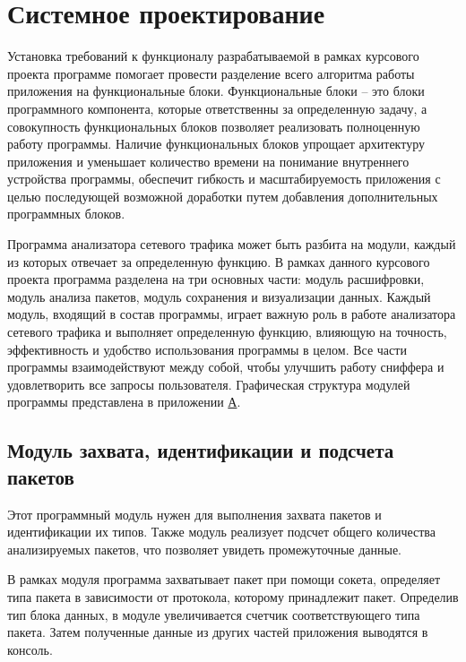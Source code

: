 \section{Системное проектирование}
\label{sec:sysproj}

Установка требований к функционалу разрабатываемой в рамках
курсового проекта программе помогает провести разделение всего алгоритма
работы приложения на функциональные блоки. Функциональные блоки -- это
блоки программного компонента, которые ответственны за определенную
задачу, а совокупность функциональных блоков позволяет реализовать
полноценную работу программы. Наличие функциональных блоков упрощает 
архитектуру приложения и уменьшает количество времени на понимание 
внутреннего устройства программы, обеспечит гибкость и масштабируемость 
приложения с целью последующей возможной доработки путем добавления 
дополнительных программных блоков.


Программа анализатора сетевого трафика может быть разбита на модули,
каждый из которых отвечает за определенную функцию. В рамках данного
курсового проекта программа разделена на три основных части: модуль
расшифровки, модуль анализа пакетов, модуль сохранения и визуализации
данных. Каждый модуль, входящий в состав программы, играет важную роль в
работе анализатора сетевого трафика и выполняет определенную функцию,
влияющую на точность, эффективность и удобство использования
программы в целом. Все части программы взаимодействуют между собой, чтобы
улучшить работу сниффера и удовлетворить все запросы пользователя.
Графическая структура модулей программы представлена в приложении \hyperref[sec:appendix:scheme_struct]{А}.



\subsection{Модуль захвата, идентификации и подсчета пакетов}

Этот программный модуль нужен для выполнения захвата пакетов и 
идентификации их типов. Также модуль реализует подсчет общего 
количества анализируемых пакетов, что позволяет увидеть промежуточные данные.


В рамках модуля программа захватывает пакет при помощи сокета,
определяет типа пакета в зависимости от протокола, которому принадлежит
пакет. Определив тип блока данных, в модуле увеличивается счетчик 
соответствующего типа пакета. Затем полученные данные из других частей 
приложения выводятся в консоль.



